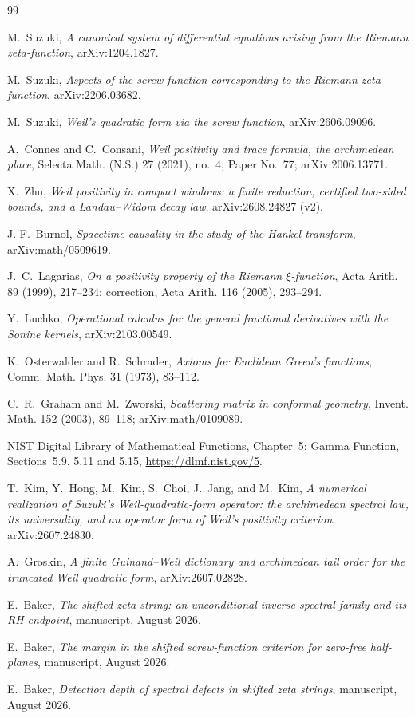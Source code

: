 \documentclass[11pt,a4paper]{article}
\theoremstyle{plain}
\theoremstyle{definition}
\numberwithin{equation}{section}
\begin{document}
\begin{thebibliography}{99}
\small

M.~Suzuki,
\emph{A canonical system of differential equations arising from the Riemann
zeta-function}, arXiv:1204.1827.

M.~Suzuki,
\emph{Aspects of the screw function corresponding to the Riemann
zeta-function}, arXiv:2206.03682.

M.~Suzuki,
\emph{Weil's quadratic form via the screw function}, arXiv:2606.09096.

A.~Connes and C.~Consani,
\emph{Weil positivity and trace formula, the archimedean place},
Selecta Math. (N.S.) 27 (2021), no.~4, Paper No.~77; arXiv:2006.13771.

X.~Zhu,
\emph{Weil positivity in compact windows: a finite reduction, certified
two-sided bounds, and a Landau--Widom decay law}, arXiv:2608.24827 (v2).

J.-F.~Burnol,
\emph{Spacetime causality in the study of the Hankel transform},
arXiv:math/0509619.

J.~C.~Lagarias,
\emph{On a positivity property of the Riemann $\xi$-function},
Acta Arith. 89 (1999), 217--234; correction, Acta Arith. 116 (2005), 293--294.

Y.~Luchko,
\emph{Operational calculus for the general fractional derivatives with the
Sonine kernels}, arXiv:2103.00549.

K.~Osterwalder and R.~Schrader,
\emph{Axioms for Euclidean Green's functions},
Comm. Math. Phys. 31 (1973), 83--112.

C.~R.~Graham and M.~Zworski,
\emph{Scattering matrix in conformal geometry},
Invent. Math. 152 (2003), 89--118; arXiv:math/0109089.

NIST Digital Library of Mathematical Functions, Chapter~5: Gamma Function,
Sections~5.9, 5.11 and 5.15, \url{https://dlmf.nist.gov/5}.

T.~Kim, Y.~Hong, M.~Kim, S.~Choi, J.~Jang, and M.~Kim,
\emph{A numerical realization of Suzuki's Weil-quadratic-form operator: the
archimedean spectral law, its universality, and an operator form of Weil's
positivity criterion}, arXiv:2607.24830.

A.~Groskin,
\emph{A finite Guinand--Weil dictionary and archimedean tail order for the
truncated Weil quadratic form}, arXiv:2607.02828.

E.~Baker,
\emph{The shifted zeta string: an unconditional inverse-spectral family and
its RH endpoint}, manuscript, August 2026.

E.~Baker,
\emph{The margin in the shifted screw-function criterion for zero-free
half-planes}, manuscript, August 2026.

E.~Baker,
\emph{Detection depth of spectral defects in shifted zeta strings},
manuscript, August 2026.

\end{thebibliography}
\end{document}
